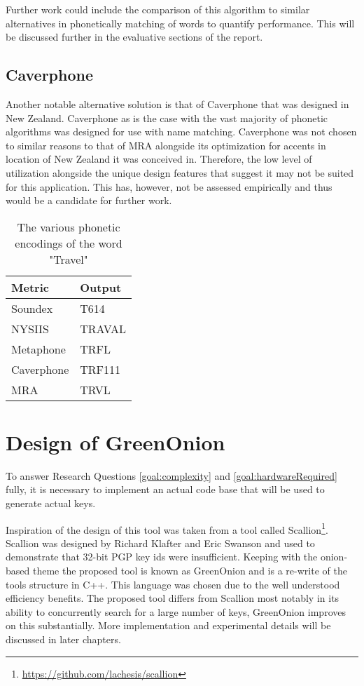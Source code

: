 Further work could include the comparison of this algorithm  to similar alternatives in phonetically matching of words to quantify performance. This will be discussed further in the evaluative sections of the report.

\subsection{Caverphone}
Another notable alternative solution is that of Caverphone that was designed in New Zealand. Caverphone as is the case with the vast majority of phonetic algorithms was designed for use with name matching. Caverphone was not chosen to similar reasons to that of MRA alongside its optimization for accents in location of New Zealand it was conceived in. Therefore, the low level of utilization alongside the unique design features that suggest it may not be suited for this application. This has, however, not be assessed empirically and thus would be a candidate for further work.

\begin{table}[h!]
    \centering
    \begin{tabular}{ll}
        Metric & Output \\
        \hline    
        Soundex & T614 \\
        NYSIIS & TRAVAL\\
        Metaphone & TRFL\\
        Caverphone & TRF111\\
        MRA & TRVL
    \end{tabular}
    \caption{The various phonetic encodings of the word "Travel"}
\end{table}

\section{Design of GreenOnion}
To answer Research Questions \ref{goal:complexity} and \ref{goal:hardwareRequired} fully, it is necessary to implement an actual code base that will be used to generate actual keys. 

Inspiration of the design of this tool was taken from a tool called Scallion\footnote{\url{https://github.com/lachesis/scallion}}. Scallion was designed by Richard Klafter and Eric Swanson and used to demonstrate that 32-bit PGP key ids were insufficient. Keeping with the onion-based theme the proposed tool is known as GreenOnion and is a re-write of the tools structure in C++. This language was chosen due to the well understood efficiency benefits. The proposed tool differs from Scallion most notably in its ability to concurrently search for a large number of keys, GreenOnion improves on this substantially. More implementation and experimental details will be discussed in later chapters.

